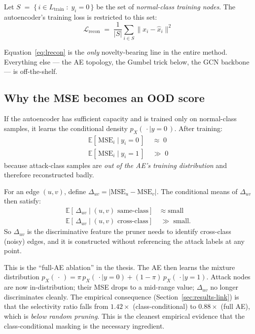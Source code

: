 \documentclass[11pt,a4paper]{article}
\begin{document}
Let $S \;=\; \{\,i \in L_{\text{train}} \;:\; y_i = 0\,\}$ be the set of
\emph{normal-class training nodes}. The autoencoder's training loss is
restricted to this set:
\begin{equation}
\boxed{\;\mathcal{L}_{\text{recon}}
\;=\; \frac{1}{|S|}\sum_{i \in S}\| x_i - \hat{x}_i \|^2\;}
\label{eq:lrecon}
\end{equation}

Equation~\eqref{eq:lrecon} is the \emph{only} novelty-bearing line in
the entire method. Everything else --- the AE topology, the Gumbel
trick below, the GCN backbone --- is off-the-shelf.

\subsection{Why the MSE becomes an OOD score}

If the autoencoder has sufficient capacity and is trained only on
normal-class samples, it learns the conditional density
$p_X(\,\cdot \mid y=0\,)$. After training:
\begin{align*}
\mathbb{E}[\,\mathrm{MSE}_i \mid y_i = 0\,] &\;\approx\; 0\\
\mathbb{E}[\,\mathrm{MSE}_i \mid y_i = 1\,] &\;\gg\; 0
\end{align*}
because attack-class samples are \emph{out of the AE's training
distribution} and therefore reconstructed badly.

For an edge $(u, v)$, define
\(\Delta_{uv} = |\mathrm{MSE}_u - \mathrm{MSE}_v|\).
The conditional means of $\Delta_{uv}$ then satisfy:
\begin{align*}
\mathbb{E}[\,\Delta_{uv} \mid (u,v) \text{ same-class}] &\;\approx\; \text{small}\\
\mathbb{E}[\,\Delta_{uv} \mid (u,v) \text{ cross-class}] &\;\gg\; \text{small}.
\end{align*}
So $\Delta_{uv}$ is the discriminative feature the pruner needs to
identify cross-class (noisy) edges, and it is constructed without
referencing the attack labels at any point.

\begin{notebox}
This is the ``full-AE ablation'' in the thesis. The AE then learns the
mixture distribution
$p_X(\,\cdot\,) = \pi\,p_X(\,\cdot\mid y=0) + (1-\pi)\,p_X(\,\cdot\mid y=1)$.
Attack nodes are now in-distribution; their MSE drops to a mid-range
value; $\Delta_{uv}$ no longer discriminates cleanly. The empirical
consequence (Section~\ref{sec:results-link}) is that the selectivity
ratio falls from $1.42\times$ (class-conditional) to $0.88\times$
(full AE), which is \emph{below random pruning}. This is the cleanest
empirical evidence that the class-conditional masking is the necessary
ingredient.
\end{notebox}
\end{document}
